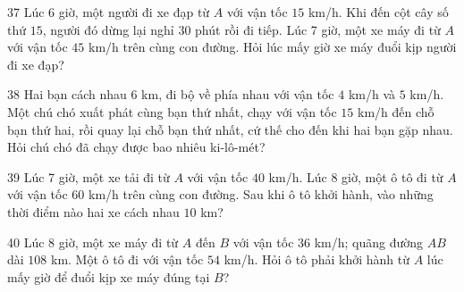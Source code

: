 \gap
\begin{probbox}{37}{}
Lúc 6 giờ, một người đi xe đạp từ $A$ với vận tốc $15$ km/h. Khi đến cột cây số thứ $15$, người đó dừng lại nghỉ $30$ phút rồi đi tiếp. Lúc 7 giờ, một xe máy đi từ $A$ với vận tốc $45$ km/h trên cùng con đường. Hỏi lúc mấy giờ xe máy đuổi kịp người đi xe đạp?
\end{probbox}
\gap
\begin{probbox}{38}{}
Hai bạn cách nhau $6$ km, đi bộ về phía nhau với vận tốc $4$ km/h và $5$ km/h. Một chú chó xuất phát cùng bạn thứ nhất, chạy với vận tốc $15$ km/h đến chỗ bạn thứ hai, rồi quay lại chỗ bạn thứ nhất, cứ thế cho đến khi hai bạn gặp nhau. Hỏi chú chó đã chạy được bao nhiêu ki-lô-mét?
\end{probbox}
\gap
\begin{probbox}{39}{}
Lúc 7 giờ, một xe tải đi từ $A$ với vận tốc $40$ km/h. Lúc 8 giờ, một ô tô đi từ $A$ với vận tốc $60$ km/h trên cùng con đường. Sau khi ô tô khởi hành, vào những thời điểm nào hai xe cách nhau $10$ km?
\end{probbox}
\gap
\begin{probbox}{40}{}
Lúc 8 giờ, một xe máy đi từ $A$ đến $B$ với vận tốc $36$ km/h; quãng đường $AB$ dài $108$ km. Một ô tô đi với vận tốc $54$ km/h. Hỏi ô tô phải khởi hành từ $A$ lúc mấy giờ để đuổi kịp xe máy đúng tại $B$?
\end{probbox}
